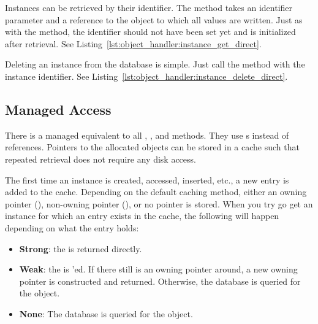 

Instances can be retrieved by their identifier. The  method takes an identifier parameter and a reference to the object to which all values are written. Just as with the  method, the identifier should not have been set yet and is initialized after retrieval. See Listing~\ref{lst:object_handler:instance_get_direct}.



Deleting an instance from the database is simple. Just call the  method with the instance identifier. See Listing~\ref{lst:object_handler:instance_delete_direct}.



\subsection{Managed Access}

There is a managed equivalent to all , ,  and  methods. They use s instead of references. Pointers to the allocated objects can be stored in a cache such that repeated retrieval does not require any disk access.

The first time an instance is created, accessed, inserted, etc., a new entry is added to the cache. Depending on the default caching method, either an owning pointer (), non-owning pointer (), or no pointer is stored. When you try go get an instance for which an entry exists in the cache, the following will happen depending on what the entry holds:

\begin{itemize}
	\item \textbf{Strong}: the  is returned directly.
	\item \textbf{Weak}: the  is 'ed. If there still is an owning pointer around, a new owning pointer is constructed and returned. Otherwise, the database is queried for the object.
	\item \textbf{None}: The database is queried for the object.
\end{itemize}

